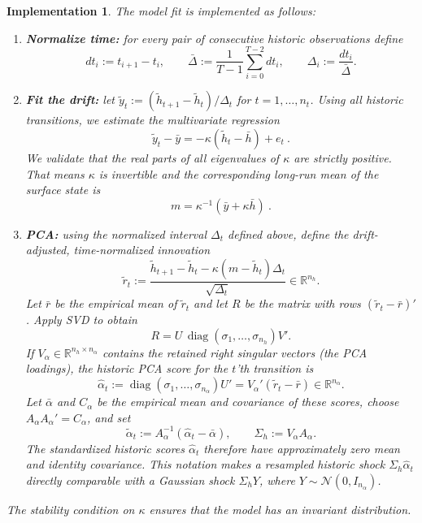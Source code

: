 \documentclass[11pt,a4paper]{article}
\newtheorem{implementation}[definition]{Implementation}
\newcommand{\R}{\mathbb{R}}
\begin{document}
\begin{implementation}
The model fit is implemented as follows:
\begin{enumerate}
\item\textbf{Normalize time:} for every pair of consecutive
historic observations define
\begin{equation}\label{eq:barDelta}
    dt_i:=t_{i+1}-t_i,
    \qquad
    \bar{\Delta}:=\frac{1}{T-1}\sum_{i=0}^{T-2}dt_i,
    \qquad
    \Delta_i:=\frac{dt_i}{\bar\Delta}.
\end{equation}

\item \textbf{Fit the drift:} let
$
    \tilde y_t:=( \tilde h_{t+1}-\tilde h_t )/\Delta_t
$
for $t=1,\ldots,n_t$.
Using all historic transitions, we estimate the multivariate regression
\[
    \tilde  y_t-\bar y=-\kappa(\tilde h_t-\bar h)+e_t \ .
\]
We validate that the real parts of all eigenvalues of $\kappa$ are strictly positive. That means $\kappa$ is invertible and
the corresponding long-run mean of the surface
state is
\begin{equation}
m=\kappa^{-1}(\bar y+\kappa\bar h) \ . 
\end{equation}

\item \textbf{PCA:} using the
normalized interval $\Delta_t$ defined above, define the drift-adjusted,
time-normalized innovation
\[
    \tilde r_t
    :=
    \frac{
        \tilde h_{t+1}-\tilde h_t
        -\kappa(m-\tilde h_t)\Delta_t
    }{\sqrt{\Delta_t}}
    \in\R^{n_h}.
\]
Let $\bar r$ be the empirical mean of $\tilde  r_t$
and let $R$ be the matrix with rows $(\tilde r_t-\bar r)'$. Apply SVD
to obtain
\[
    R=U\,\operatorname{diag}(\sigma_1,\ldots,\sigma_{n_h})V'.
\]
If $V_\alpha\in\R^{n_h\times n_\alpha}$ contains the retained right singular
vectors (the PCA loadings), the historic PCA score for the $t$'th transition  is
\[
    \hat \alpha_t
    :=\operatorname{diag}(\sigma_1,\ldots,\sigma_{n_\alpha})
       U'
     =V_\alpha'(\tilde r_t-\bar r)
    \in\R^{n_\alpha}.
\]
Let $\bar\alpha$ and $C_\alpha$ be the empirical mean and
covariance of these scores, choose $A_\alpha A_\alpha'=C_\alpha$, and set
\[
    \tilde \alpha_t:=A_\alpha^{-1}(\hat \alpha_t-\bar\alpha),
    \qquad
    \Sigma_h:=V_\alpha A_\alpha.
\]
The standardized historic scores $\hat\alpha_t$ therefore have approximately
zero mean and identity covariance. This notation makes a resampled historic
shock $\Sigma_h\hat\alpha_t$ directly comparable with a Gaussian shock
$\Sigma_hY$, where $Y\sim\mathcal N(0,I_{n_\alpha})$.


\end{enumerate}

The stability condition on $\kappa$ ensures that the model has an invariant
distribution.

\end{implementation}
\end{document}

